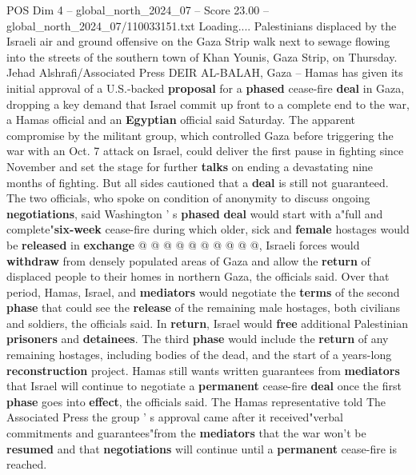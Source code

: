 \begin{textsample}{POS Dim 4 – global\_north\_2024\_07 – Score 23.00 – global\_north\_2024\_07/110033151.txt}  \label{ex:f4_pos_177}
Loading....
Palestinians displaced by the Israeli air and ground offensive on the Gaza Strip walk next to sewage flowing into the streets of the southern town of Khan Younis, Gaza Strip, on Thursday.
Jehad Alshrafi/Associated Press DEIR AL-BALAH, Gaza -- Hamas has given its initial approval of a U.S.-backed \textbf{proposal} for a \textbf{phased} cease-fire \textbf{deal} in Gaza, dropping a key demand that Israel commit up front to a complete end to the war, a Hamas official and an \textbf{Egyptian} official said Saturday.
The apparent compromise by the militant group, which controlled Gaza before triggering the war with an Oct. 7 attack on Israel, could deliver the first pause in fighting since November and set the stage for further \textbf{talks} on ending a devastating nine months of fighting.
But all sides cautioned that a \textbf{deal} is still not guaranteed.
The two officials, who spoke on condition of anonymity to discuss ongoing \textbf{negotiations}, said Washington ' s \textbf{phased} \textbf{deal} would start with a"full and complete"\textbf{six-week} cease-fire during which older, sick and \textbf{female} hostages would be \textbf{released} in \textbf{exchange} @ @ @ @ @ @ @ @ @ @, Israeli forces would \textbf{withdraw} from densely populated areas of Gaza and allow the \textbf{return} of displaced people to their homes in northern Gaza, the officials said.
Over that period, Hamas, Israel, and \textbf{mediators} would negotiate the \textbf{terms} of the second \textbf{phase} that could see the \textbf{release} of the remaining male hostages, both civilians and soldiers, the officials said.
In \textbf{return}, Israel would \textbf{free} additional Palestinian \textbf{prisoners} and \textbf{detainees}.
The third \textbf{phase} would include the \textbf{return} of any remaining hostages, including bodies of the dead, and the start of a years-long \textbf{reconstruction} project.
Hamas still wants written guarantees from \textbf{mediators} that Israel will continue to negotiate a \textbf{permanent} cease-fire \textbf{deal} once the first \textbf{phase} goes into \textbf{effect}, the officials said.
The Hamas representative told The Associated Press the group ' s approval came after it received"verbal commitments and guarantees"from the \textbf{mediators} that the war won't be \textbf{resumed} and that \textbf{negotiations} will continue until a \textbf{permanent} cease-fire is reached.

\end{textsample}
